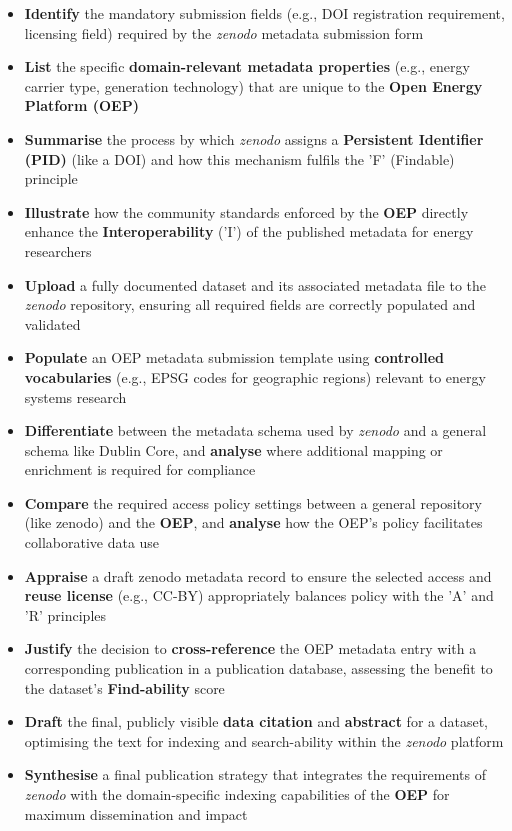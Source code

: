 \documentclass[11pt]{tibop-article}
\begin{document}
\begin{itemize}
    \item \textbf{Identify} the mandatory submission fields (e.g., DOI registration requirement, licensing field) required by the \textit{zenodo} metadata submission form
    \item \textbf{List} the specific \textbf{domain-relevant metadata properties} (e.g., energy carrier type, generation technology) that are unique to the \textbf{Open Energy Platform (OEP)}
    \item \textbf{Summarise} the process by which \textit{zenodo} assigns a \textbf{Persistent Identifier (PID)} (like a DOI) and how this mechanism fulfils the 'F' (Findable) principle
   
    \item \textbf{Illustrate} how the community standards enforced by the \textbf{OEP} directly enhance the \textbf{Interoperability} ('I') of the published metadata for energy researchers
    
    \item \textbf{Upload} a fully documented dataset and its associated metadata file to the \textit{zenodo} repository, ensuring all required fields are correctly populated and validated
    
    \item \textbf{Populate} an OEP metadata submission template using \textbf{controlled vocabularies} (e.g., EPSG codes for geographic regions) relevant to energy systems research
    
    \item \textbf{Differentiate} between the metadata schema used by \textit{zenodo} and a general schema like Dublin Core, and \textbf{analyse} where additional mapping or enrichment is required for compliance
    \item \textbf{Compare} the required access policy settings between a general repository (like zenodo) and the \textbf{OEP}, and \textbf{analyse} how the OEP's policy facilitates collaborative data use

    \item \textbf{Appraise} a draft zenodo metadata record to ensure the selected access and \textbf{reuse license} (e.g., CC-BY) appropriately balances policy with the 'A' and 'R' principles
    
    \item \textbf{Justify} the decision to \textbf{cross-reference} the OEP metadata entry with a corresponding publication in a publication database, assessing the benefit to the dataset's \textbf{Find-ability} score
    
    \item \textbf{Draft} the final, publicly visible \textbf{data citation} and \textbf{abstract} for a dataset, optimising the text for indexing and search-ability within the \textit{zenodo} platform
    
    \item \textbf{Synthesise} a final publication strategy that integrates the requirements of \textit{zenodo} with the domain-specific indexing capabilities of the \textbf{OEP} for maximum dissemination and impact
\end{itemize}
\end{document}
